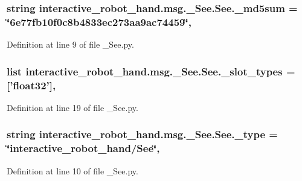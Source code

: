 \subsubsection[{\-\_\-md5sum}]{\setlength{\rightskip}{0pt plus 5cm}string interactive\-\_\-robot\-\_\-hand.\-msg.\-\_\-\-See.\-See.\-\_\-md5sum = \char`\"{}6e77fb10f0c8b4833ec273aa9ac74459\char`\"{}\hspace{0.3cm}{\ttfamily [static]}, {\ttfamily [private]}}\label{classinteractive__robot__hand_1_1msg_1_1__See_1_1See_aa3440dd0ee14b00649153c0573d9eabf}


Definition at line 9 of file \-\_\-\-See.\-py.

\subsubsection[{\-\_\-slot\-\_\-types}]{\setlength{\rightskip}{0pt plus 5cm}list interactive\-\_\-robot\-\_\-hand.\-msg.\-\_\-\-See.\-See.\-\_\-slot\-\_\-types = ['float32']\hspace{0.3cm}{\ttfamily [static]}, {\ttfamily [private]}}\label{classinteractive__robot__hand_1_1msg_1_1__See_1_1See_aafdefbadaa248dbfe25a72b16bee8f39}


Definition at line 19 of file \-\_\-\-See.\-py.

\subsubsection[{\-\_\-type}]{\setlength{\rightskip}{0pt plus 5cm}string interactive\-\_\-robot\-\_\-hand.\-msg.\-\_\-\-See.\-See.\-\_\-type = \char`\"{}interactive\-\_\-robot\-\_\-hand/{\bf See}\char`\"{}\hspace{0.3cm}{\ttfamily [static]}, {\ttfamily [private]}}\label{classinteractive__robot__hand_1_1msg_1_1__See_1_1See_aeae4f7a0e295b6494a03ce34793b7ad2}


Definition at line 10 of file \-\_\-\-See.\-py.

